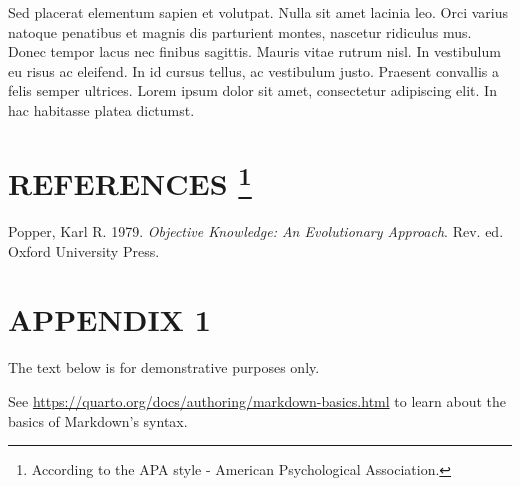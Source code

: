 \documentclass[
  12pt,
  a4paper,
  oneside]{tesesusp}
\newlength{\cslhangindent}
\newlength{\cslentryspacingunit} %
\newenvironment{CSLReferences}[2] %
 {%
  \setlength{\parindent}{0pt}
  \ifodd #1
  \let\oldpar\par
  \def\par{\hangindent=\cslhangindent\oldpar}
  \fi
  \setlength{\parskip}{#2\cslentryspacingunit}
 }%
 {}
\begin{document}
Sed placerat elementum sapien et volutpat. Nulla sit amet lacinia leo.
Orci varius natoque penatibus et magnis dis parturient montes, nascetur
ridiculus mus. Donec tempor lacus nec finibus sagittis. Mauris vitae
rutrum nisl. In vestibulum eu risus ac eleifend. In id cursus tellus, ac
vestibulum justo. Praesent convallis a felis semper ultrices. Lorem
ipsum dolor sit amet, consectetur adipiscing elit. In hac habitasse
platea dictumst.


\hypertarget{references-1}{%
\chapter*{\texorpdfstring{REFERENCES
\footnote{According to the APA style - American Psychological
  Association.}}{REFERENCES }}\label{references-1}}


\postextual

\hypertarget{refs}{}
\begin{CSLReferences}{1}{0}
\leavevmode{}%
Popper, Karl R. 1979. \emph{Objective Knowledge: An Evolutionary
Approach}. Rev. ed. Oxford University Press.

\end{CSLReferences}

\cleardoublepage
{}
{}
\appendix

\hypertarget{appendix-1}{%
\chapter{APPENDIX 1}\label{appendix-1}}

\begin{tcolorbox}[enhanced jigsaw, bottomrule=.15mm, colback=white, left=2mm, bottomtitle=1mm, breakable, toprule=.15mm, leftrule=.75mm, rightrule=.15mm, colframe=quarto-callout-tip-color-frame, opacityback=0, colbacktitle=quarto-callout-tip-color!10!white, titlerule=0mm, coltitle=black, title=\textcolor{quarto-callout-tip-color}{\faLightbulb}\hspace{0.5em}{Tip}, toptitle=1mm, arc=.35mm, opacitybacktitle=0.6]

The text below is for demonstrative purposes only.

\vspace{5pt}

See \url{https://quarto.org/docs/authoring/markdown-basics.html} to
learn about the basics of Markdown's syntax.

\end{tcolorbox}
\end{document}

